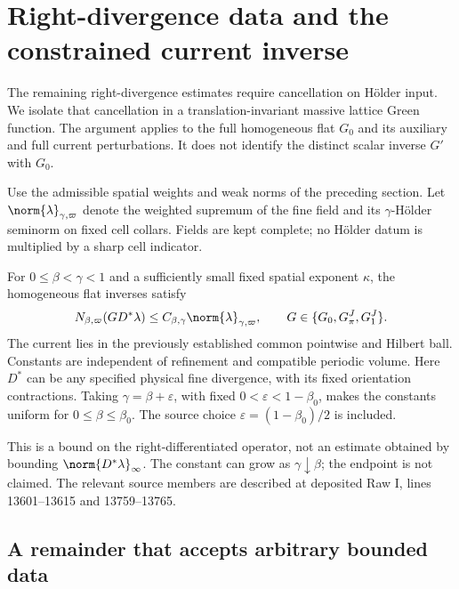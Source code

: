 \section{Right-divergence data and the constrained current inverse}
\label{rd-section}

The remaining right-divergence estimates require cancellation on
H\"older input. We isolate that cancellation in a translation-invariant
massive lattice Green function. The argument applies to the full
homogeneous flat $G_0$ and its auxiliary and full current perturbations.
It does not identify the distinct scalar inverse $G'$ with $G_0$.

Use the admissible spatial weights and weak norms of the preceding
section. Let $\norm{\lambda}_{\gamma,\varpi}$ denote the weighted
supremum of the fine field and its $\gamma$-H\"older seminorm on
fixed cell collars. Fields are kept complete; no H\"older datum is
multiplied by a sharp cell indicator.

\begin{theorem}\label{rd-theorem}
For $0\le\beta<\gamma<1$ and a sufficiently small fixed spatial
exponent $\kappa$, the homogeneous flat inverses satisfy
\begin{equation}\label{rd-main-estimate}
 N_{\beta,\varpi}(G D^*\lambda)
       \le C_{\beta,\gamma}\norm{\lambda}_{\gamma,\varpi},
 \qquad G\in\{G_0,G_\pi^J,G_1^J\}.
\end{equation}
The current lies in the previously established common pointwise and
Hilbert ball. Constants are independent of refinement and compatible
periodic volume. Here $D^*$ can be any specified physical fine
divergence, with its fixed orientation contractions. Taking
$\gamma=\beta+\varepsilon$, with fixed
$0<\varepsilon<1-\beta_0$, makes the constants uniform for
$0\le\beta\le\beta_0$. The source choice
$\varepsilon=(1-\beta_0)/2$ is included.
\end{theorem}

This is a bound on the right-differentiated operator, not an estimate
obtained by bounding $\norm{D^*\lambda}_\infty$. The constant can
grow as $\gamma\downarrow\beta$; the endpoint is not claimed.
The relevant source members are described at deposited Raw I,
lines 13601--13615 and 13759--13765.

\subsection{A remainder that accepts arbitrary bounded data}

